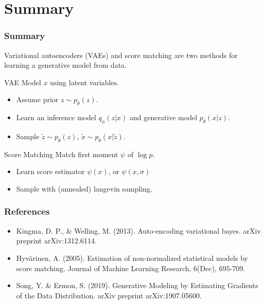 \documentclass{beamer}
\begin{document}
\section{Summary}
\begin{frame}
  \frametitle{Summary}
  Variational autoencoders (VAEs) and score matching are two methods for learning a generative model from data.
  
  \begin{block}{VAE}
    Model $x$ using latent variables.
  \end{block}
  \begin{itemize}
    \item Assume prior $z \sim p_\theta(z)$.
    \item Learn an inference model $q_\phi(z|x)$ and generative model $p_\theta(x|z)$.
    \item Sample $\tilde{z} \sim p_\theta(z)$, $\tilde{x} \sim p_\theta(x|\tilde{z})$.
  \end{itemize}
  
  \begin{block}{Score Matching}
    Match first moment $\psi$ of $\log p$.
  \end{block}
  \begin{itemize}
    \item Learn score estimator $\psi(x)$, or $\psi(x, \sigma)$
    \item Sample with (annealed) langevin sampling.
  \end{itemize}
\end{frame}

\begin{frame}
    \frametitle{References}
    \begin{itemize}
        \item Kingma, D. P., \& Welling, M. (2013). Auto-encoding variational bayes. arXiv preprint arXiv:1312.6114.
        \item Hyvärinen, A. (2005). Estimation of non-normalized statistical models by score matching. Journal of Machine Learning Research, 6(Dec), 695-709.
        \item Song, Y. \& Ermon, S. (2019). Generative Modeling by Estimating Gradients of the
        Data Distribution. arXiv preprint arXiv:1907.05600.
    \end{itemize}
\end{frame}
\end{document}
